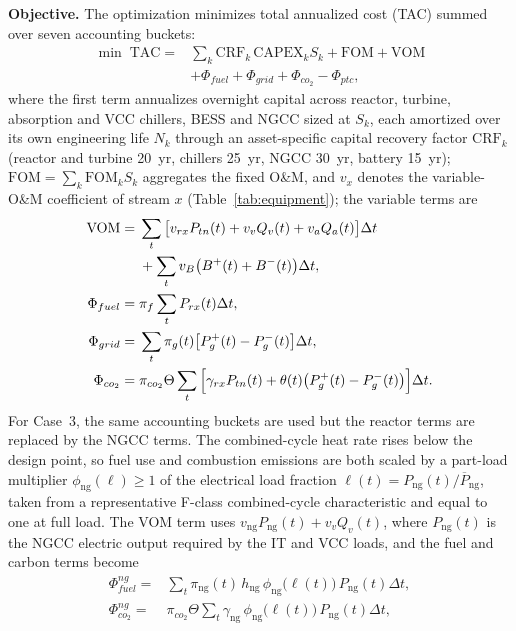 \documentclass[a4paper,fleqn]{cas-sc}
\newcommand{\runinhead}[1]{\par\smallskip\noindent\textbf{#1.}\quad}
\begin{document}
\runinhead{Objective}
The optimization minimizes total annualized cost (TAC) summed over seven accounting buckets:
\begin{equation}
\label{eq:tac}
\begin{aligned}
\min\; \mathrm{TAC} ={}&
\sum_k \mathrm{CRF}_k\,\mathrm{CAPEX}_k S_k + \mathrm{FOM} + \mathrm{VOM}\\
& + \Phi_{fuel} + \Phi_{grid} + \Phi_{co_2} - \Phi_{ptc},
\end{aligned}
\end{equation}
where the first term annualizes overnight capital across reactor, turbine, absorption and VCC chillers, BESS and NGCC sized at $S_k$, each amortized over its own engineering life $N_k$ through an asset-specific capital recovery factor $\mathrm{CRF}_k$ (reactor and turbine 20~yr, chillers 25~yr, NGCC 30~yr, battery 15~yr); $\mathrm{FOM}=\sum_k \mathrm{FOM}_k S_k$ aggregates the fixed O\&M, and $v_x$ denotes the variable-O\&M coefficient of stream $x$ (Table~\ref{tab:equipment}); the variable terms are
\begin{align}
\mathrm{VOM} ={}&
  \sum_t \big[v_{rx} P_{tn}(t) + v_v Q_v(t) + v_a Q_a(t)\big]\Delta t
  \notag\\
& + \sum_t v_B\big(B^{+}(t)+B^{-}(t)\big)\Delta t, \label{eq:vom}\\
\Phi_{fuel} ={}& \pi_f \sum_t P_{rx}(t)\Delta t, \label{eq:fuel_cost}\\
\Phi_{grid} ={}&
  \sum_t \pi_g(t)\big[P_g^{+}(t) - P_g^{-}(t)\big]\Delta t, \label{eq:grid_cost}\\
\Phi_{co_2} ={}&
  \pi_{co_2}\Theta \sum_t
  \Big[\gamma_{rx} P_{tn}(t) + \theta(t)\big(P_g^{+}(t)-P_g^{-}(t)\big)\Big]\Delta t. \label{eq:carbon_cost}
\end{align}
For Case~3, the same accounting buckets are used but the reactor terms are replaced by the NGCC terms. The combined-cycle heat rate rises below the design point, so fuel use and combustion emissions are both scaled by a part-load multiplier $\phi_{\mathrm{ng}}(\ell)\ge 1$ of the electrical load fraction $\ell(t)=P_{\mathrm{ng}}(t)/\overline{P}_{\mathrm{ng}}$, taken from a representative F-class combined-cycle characteristic and equal to one at full load. The VOM term uses $v_{\mathrm{ng}}P_{\mathrm{ng}}(t)+v_vQ_v(t)$, where $P_{\mathrm{ng}}(t)$ is the NGCC electric output required by the IT and VCC loads, and the fuel and carbon terms become
\begin{align}
\Phi_{fuel}^{ng} ={}& \sum_t \pi_{\mathrm{ng}}(t)\,h_{\mathrm{ng}}\,\phi_{\mathrm{ng}}\!\big(\ell(t)\big)\,P_{\mathrm{ng}}(t)\Delta t, \label{eq:ngcc_fuel_cost}\\
\Phi_{co_2}^{ng} ={}&
  \pi_{co_2}\Theta \sum_t
  \gamma_{\mathrm{ng}}\,\phi_{\mathrm{ng}}\!\big(\ell(t)\big)\, P_{\mathrm{ng}}(t)\Delta t, \label{eq:ngcc_carbon_cost}
\end{align}
\end{document}
